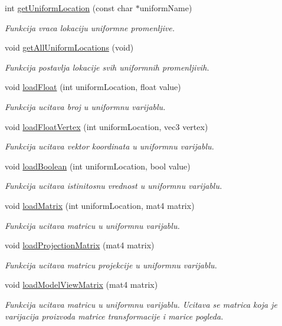 \begin{DoxyCompactItemize}
int \hyperlink{classshader_1_1ParticleShader_ade4e67ce9cc3b4d2a7ca068fc8ae885f}{get\+Uniform\+Location} (const char $\ast$uniform\+Name)
\begin{DoxyCompactList}\small\item\em Funkcija vraca lokaciju uniformne promenljive. \end{DoxyCompactList}\item 
void \hyperlink{classshader_1_1ParticleShader_a3951e093f0d29d60be87d3aad4d79f06}{get\+All\+Uniform\+Locations} (void)
\begin{DoxyCompactList}\small\item\em Funkcija postavlja lokacije svih uniformnih promenljivih. \end{DoxyCompactList}\item 
void \hyperlink{classshader_1_1ParticleShader_a55302fe993044f41bf046c7116fc1230}{load\+Float} (int uniform\+Location, float value)
\begin{DoxyCompactList}\small\item\em Funkcija ucitava broj u uniformnu varijablu. \end{DoxyCompactList}\item 
void \hyperlink{classshader_1_1ParticleShader_a1cf3a18c68299861cd2395fd6be99372}{load\+Float\+Vertex} (int uniform\+Location, vec3 vertex)
\begin{DoxyCompactList}\small\item\em Funkcija ucitava vektor koordinata u uniformnu varijablu. \end{DoxyCompactList}\item 
void \hyperlink{classshader_1_1ParticleShader_ac4108c33106a52c28c41cbe0ddbaaed7}{load\+Boolean} (int uniform\+Location, bool value)
\begin{DoxyCompactList}\small\item\em Funkcija ucitava istinitosnu vrednost u uniformnu varijablu. \end{DoxyCompactList}\item 
void \hyperlink{classshader_1_1ParticleShader_a111c1d93a763340300faa294f6509497}{load\+Matrix} (int uniform\+Location, mat4 matrix)
\begin{DoxyCompactList}\small\item\em Funkcija ucitava matricu u uniformnu varijablu. \end{DoxyCompactList}\item 
void \hyperlink{classshader_1_1ParticleShader_a2ff33e55d9eed630496a7e80fa5a3015}{load\+Projection\+Matrix} (mat4 matrix)
\begin{DoxyCompactList}\small\item\em Funkcija ucitava matricu projekcije u uniformnu varijablu. \end{DoxyCompactList}\item 
void \hyperlink{classshader_1_1ParticleShader_a7de43ca31b341d0c5e05dcd7ca6a6390}{load\+Model\+View\+Matrix} (mat4 matrix)
\begin{DoxyCompactList}\small\item\em Funkcija ucitava matricu u uniformnu varijablu. Ucitava se matrica koja je varijacija proizvoda matrice transformacije i marice pogleda. \end{DoxyCompactList}\end{DoxyCompactItemize}
